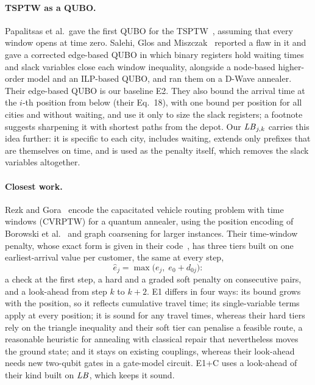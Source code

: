 \paragraph{TSPTW as a QUBO.} Papalitsas et al.\ gave the first QUBO for the
TSPTW~\cite{papalitsas2019qubo}, assuming that every window opens at time zero. Salehi, Glos
and Miszczak~\cite{salehi2022unconstrained} reported a flaw in it and gave a corrected
edge-based QUBO in which binary registers hold waiting times and slack variables close each
window inequality, alongside a node-based higher-order model and an ILP-based QUBO, and ran them
on a D-Wave annealer. Their edge-based QUBO is our baseline E2. They also bound the arrival time
at the $i$-th position from below (their Eq.~18), with one bound per position for all cities and
without waiting, and use it only to size the slack registers; a footnote suggests sharpening it
with shortest paths from the depot. Our $\mathit{LB}_{j,k}$ carries this idea further: it is specific to
each city, includes waiting, extends only prefixes that are themselves on time, and is used as
the penalty itself, which removes the slack variables altogether.

\paragraph{Closest work.} Rezk and Gora~\cite{rezk2026gnn} encode the capacitated vehicle
routing problem with time windows (CVRPTW) for a quantum annealer, using the position encoding
of Borowski et al.~\cite{borowski2020new} and graph coarsening for larger instances. Their
time-window penalty, whose exact form is given in their code~\cite{rezk2026code}, has three
tiers built on one earliest-arrival value per customer, the same at every step,
\[ \hat e_j = \max\bigl(e_j,\; e_0 + d_{0j}\bigr): \]
a check at the first step, a hard and a graded soft penalty on consecutive pairs, and a
look-ahead from step $k$ to $k+2$. E1 differs in four ways: its bound grows with the position,
so it reflects cumulative travel time; its single-variable terms apply at every position; it is
sound for any travel times, whereas their hard tiers rely on the triangle inequality and their
soft tier can penalise a feasible route, a reasonable heuristic for annealing with classical
repair that nevertheless moves the ground state; and it stays on existing couplings, whereas
their look-ahead needs new two-qubit gates in a gate-model circuit. E1+C uses a look-ahead of
their kind built on $\mathit{LB}$, which keeps it sound.

